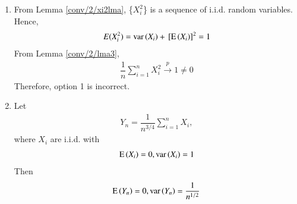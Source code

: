 \begin{enumerate}
\item 
From Lemma \ref{conv/2/xi2lma}, \{$X_i^2$\} is a sequence of i.i.d. random variables.  Hence, 
\begin{align}
    E(X_i^2)=\text{var}\left( X_i \right)+{}\left[\text{E}\left( X_i \right)\right]^2 = 1
\end{align}
From Lemma \ref{conv/2/lma3},  
\begin{align} \label{conv/2/opt4}
   \dfrac{1}{n}\sum_{i=1}^n X_i^2 \xrightarrow[]{p} 1 \ne 0 
\end{align}
Therefore, option 1 is incorrect.
\item 
\begin{lemma} \label{conv/2/result2}
    Let    
    \begin{align}
        Y_n=\dfrac{1}{n^{3/4}}\sum_{i=1}^n X_i,
    \end{align}
    where $X_i$ are i.i.d.  with 
    \begin{align}
        \text{E}\left( X_i \right) = 0, \text{var}\left( X_i \right) = 1
            \end{align}
        Then 
        \begin{align}
            \text{E}\left( Y_n \right) = 0,  \text{var}\left( Y_n \right) = \dfrac{1}{n^{1/2}} 
                \end{align}
            
\end{lemma}


\end{enumerate}
